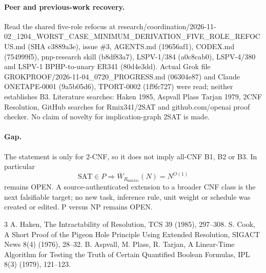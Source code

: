 \documentclass{article}
\begin{document}
\paragraph{Peer and previous-work recovery.} Read the shared five-role refocus at research/coordination/2026-11-02\_1204\_WORST\_CASE\_MINIMUM\_DERIVATION\_FIVE\_ROLE\_REFOCUS.md (SHA c3889a3e), issue \#3, AGENTS.md (19656af1), CODEX.md (754999f5), pnp-research skill (b8df83a7), LSPV-1/384 (a0c8cab0), LSPV-4/380 and LSPV-1 BPHP-to-unary ER341 (80d4e3dd). Actual Grok file GROKPROOF/2026-11-04\_0720\_PROGRESS.md (06304e87) and Claude ONETAPE-0001 (9a5b05d6), TPORT-0002 (1f9fc727) were read; neither establishes B3. Literature searches: Haken 1985, Aspvall Plass Tarjan 1979, 2CNF Resolution, GitHub searches for Rmix341/2SAT and github.com/openai proof checker. No claim of novelty for implication-graph 2SAT is made.

\paragraph{Gap.} The statement is only for 2-CNF, so it does not imply all-CNF B1, B2 or B3. In particular
\[
\mathrm{SAT}\in P\Longrightarrow\overline W_{R_{\mathrm{mix341}}}(N)=N^{O(1)}
\]
remains OPEN. A source-authenticated extension to a broader CNF class is the next falsifiable target; no new task, inference rule, unit weight or schedule was created or edited. P versus NP remains OPEN.

\begin{thebibliography}{3}
 A. Haken, The Intractability of Resolution, TCS 39 (1985), 297--308.
 S. Cook, A Short Proof of the Pigeon Hole Principle Using Extended Resolution, SIGACT News 8(4) (1976), 28--32.
 B. Aspvall, M. Plass, R. Tarjan, A Linear-Time Algorithm for Testing the Truth of Certain Quantified Boolean Formulas, IPL 8(3) (1979), 121--123.
\end{thebibliography}
\end{document}
